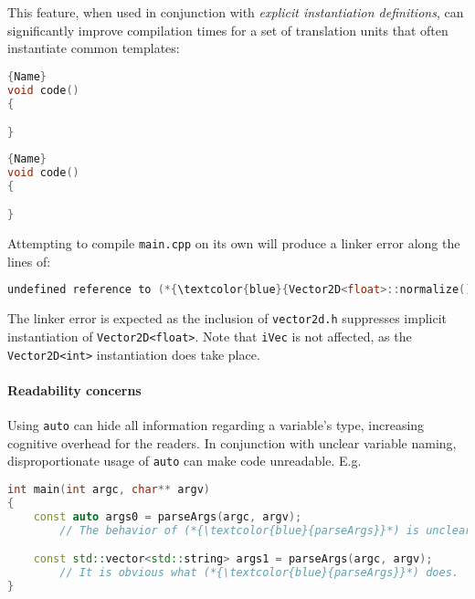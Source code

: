 \documentclass[twoside,10pt,letterpaper,usenames]{newstyle-PearsonGeneric-7-38}
\begin{document}
This feature, when used in conjunction with \emph{explicit instantiation
definitions}, can significantly improve compilation times for a set of
translation units that often instantiate common templates:

\noindent\begin{minipage}{.45\textwidth}
\begin{lstlisting}[language=C++, caption=code 1,frame=tb]{Name}
void code()
{

}
\end{lstlisting}
\end{minipage}\hfill
\begin{minipage}{.45\textwidth}
\begin{lstlisting}[language=C++, caption=code 2,frame=tb]{Name}
void code()
{

}
\end{lstlisting}
\end{minipage}

Attempting to compile \texttt{main.cpp} on its own will produce a linker
error along the lines of:

\begin{lstlisting}[language=C++]
undefined reference to (*{\textcolor{blue}{Vector2D<float>::normalize()}}*)
\end{lstlisting}
    

The linker error is expected as the inclusion of \texttt{vector2d.h}
suppresses implicit instantiation of \texttt{Vector2D<float>}. Note that
\texttt{iVec} is not affected, as the \texttt{Vector2D<int>}
instantiation does take place.

\paragraph[Readability concerns]{Readability concerns}\label{readability-concerns}

Using \texttt{auto} can hide all information regarding a variable's
type, increasing cognitive overhead for the readers. In conjunction with
unclear variable naming, disproportionate usage of \texttt{auto} can
make code unreadable. E.g.

\begin{lstlisting}[language=C++]
int main(int argc, char** argv)
{
    const auto args0 = parseArgs(argc, argv);
        // The behavior of (*{\textcolor{blue}{parseArgs}}*) is unclear.

    const std::vector<std::string> args1 = parseArgs(argc, argv);
        // It is obvious what (*{\textcolor{blue}{parseArgs}}*) does.
}
\end{lstlisting}
    
\end{document}
